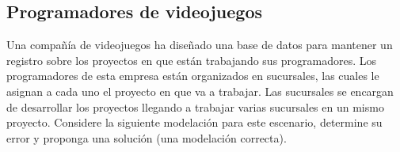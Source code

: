 \subsection{Programadores de videojuegos}
Una compa\~n\'ia de videojuegos ha dise\~nado una base de datos para mantener un registro sobre los proyectos en que est\'an trabajando sus programadores. Los programadores de esta empresa est\'an organizados en sucursales, las cuales le asignan a cada uno el proyecto en que va a trabajar. Las sucursales se encargan de desarrollar los proyectos llegando a trabajar varias sucursales en un mismo proyecto.  Considere la siguiente modelaci\'on para este escenario, determine su error y proponga una soluci\'on (una modelaci\'on correcta).\\

